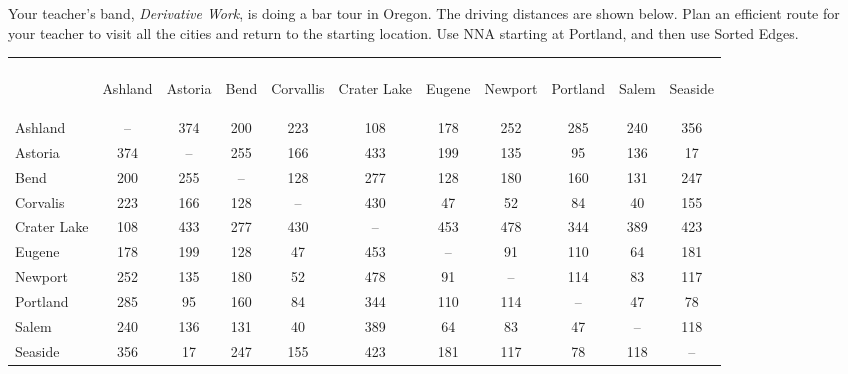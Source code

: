 \begin{example}{}{} %
Your teacher's band, \textit{Derivative Work}, is doing a bar tour in Oregon.  The driving distances are shown below.  Plan an efficient route for your teacher to visit all the cities and return to the starting location.  Use NNA starting at Portland, and then use Sorted Edges.
\begin{center}
\begin{tabular}{|l|c|c|c|c|c|c|c|c|c|c|}
\hline
&&&&&&&&&&\\[7ex]
& \begin{rotate}{90}Ashland \end{rotate}& \begin{rotate}{90}Astoria\end{rotate}  & \begin{rotate}{90}Bend \end{rotate}& \begin{rotate}{90}Corvallis \end{rotate} & \begin{rotate}{90}Crater Lake \end{rotate} &  \begin{rotate}{90}Eugene  \end{rotate}&  \begin{rotate}{90}Newport \end{rotate} &  \begin{rotate}{90}Portland  \end{rotate}& \begin{rotate}{90}Salem \end{rotate} &  \begin{rotate}{90}Seaside \end{rotate}\\
\hline
Ashland & --&374&200&223&108&178&252&285&240&356\\
\hline
Astoria & 374&--&255&166&433&199&135&95&136&17\\
\hline
Bend & 200 & 255 &--&128&277&128&180 & 160&131&247\\
\hline
Corvalis&223&166&128&--&430&47&52&84&40&155\\
\hline
Crater Lake &108&433&277&430&--&453&478&344&389&423\\
\hline
Eugene &178&199&128&47&453&--&91&110&64&181\\
\hline
Newport&252&135&180&52&478&91&--&114&83&117\\
\hline
Portland &285&95&160&84&344&110&114&--&47&78\\
\hline
Salem & 240 &136&131&40&389&64&83&47&--&118\\
\hline
Seaside&356&17&247&155&423&181&117&78&118&--\\
\hline
\end{tabular}
\end{center}




\end{example}
